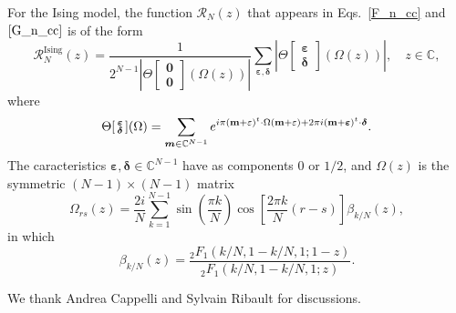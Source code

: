 \documentclass[a4paper,11pt]{article}
\def\chartheta#1#2{\Theta\!\left[\begin{smallmatrix}#1\\#2\end{smallmatrix}\right]\!}
\begin{document}
For the Ising model, the function $\mathcal{R}_N(z)$ that appears in Eqs.~\eqref{F_n_cc}
and $\eqref{G_n_cc}$ is of the form
\begin{equation}\label{R_n_ising}
\mathcal{R}_N^{\text{Ising}}(z)=\frac{1}{2^{N-1}|\chartheta{\boldsymbol{0}}{\boldsymbol{0}}(\Omega(z))|}
\sum_{\boldsymbol{\varepsilon},\boldsymbol{\delta}}
\left|\chartheta{\boldsymbol{\varepsilon}}{\boldsymbol{\delta}} (\Omega(z))\right|,\quad z\in\mathbb{C},
\end{equation}
where
$$\chartheta{\boldsymbol{\varepsilon}}{\boldsymbol{\delta}} (\Omega)=
\sum_{\boldsymbol{m}\in\mathbb{C}^{N-1}}
e^{i\pi({\bf m}+{\bf \varepsilon})^t
\cdot \Omega({\bf m}+{\bf \varepsilon})+2\pi i 
({\bf m}+\boldsymbol{\varepsilon})^t\cdot \boldsymbol{\delta}}.
$$
The caracteristics $\boldsymbol{\varepsilon},\boldsymbol{\delta}\in\mathbb{C}^{N-1}$
have as components $0$ or $1/2$, and $\Omega(z)$ is the symmetric $(N-1)\times (N-1)$
matrix 
\begin{equation}\label{period_matrix}
\Omega_{rs}(z)=\frac{2 i}{N}\sum_{k=1}^{N-1}\sin\left(\frac{\pi k}{N}\right)
\cos\left[\frac{2\pi k}{N}(r-s)\right]\beta_{k/N}(z),
\end{equation}
in which
$$\beta_{k/N}(z)=\frac{_2F_1(k/N, 1-k/N, 1; 1-z)}{_2F_1(k/N, 1-k/N, 1; z)}.$$

\acknowledgments
We thank Andrea Cappelli and Sylvain Ribault for discussions.





\end{document}
